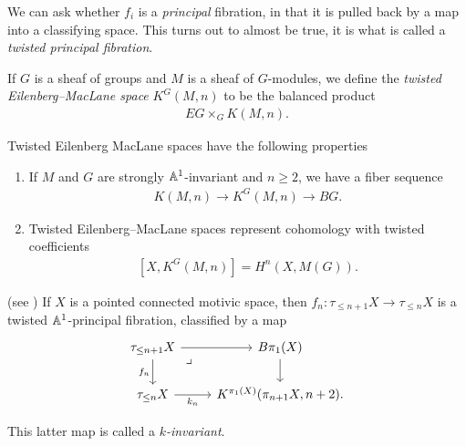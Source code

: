 \documentclass[11pt,openany]{book}
\begin{document}
We can ask whether $f_i$ is a \textit{principal} fibration, in that it is pulled back by a map into a classifying space. This turns out to almost be true, it is what is called a \textit{twisted principal fibration}.

\begin{definition} \cite[B.2]{Morel}
If $G$ is a sheaf of groups and $M$ is a sheaf of $G$-modules, we define the \textit{twisted Eilenberg--MacLane space} $K^G(M,n)$ to be the balanced product
\begin{align*}
    EG \times_G K(M,n).
\end{align*}
\end{definition}

\begin{proposition} Twisted Eilenberg MacLane spaces have the following properties
\begin{enumerate}
    \item If $M$ and $G$ are strongly $\mathbb{A}^1$-invariant and $n\ge 2$, we have a fiber sequence \cite[4.17]{ABH-nilpotent}
    \begin{align*}
        K(M,n) \to K^G(M,n) \to BG.
    \end{align*}
    
    \item Twisted Eilenberg--MacLane spaces represent cohomology with twisted coefficients
    \begin{align*}
        \left[ X, K^G(M,n) \right] = H^n(X,M(G)).
    \end{align*}
\end{enumerate}
\end{proposition}


\begin{proposition} (see \cite[6.1]{AF3}) If $X$ is a pointed connected motivic space, then $f_n \colon \tau_{\le n+1} X \to \tau_{\le n} X$ is a twisted $\mathbb{A}^1$-principal fibration, classified by a map
\[\begin{tikzcd}
    \tau_{\le n+1}X\rar\dar["f_n" left]\pb & B\pi_1(X)\dar\\
    \tau_{\le n} X\rar["k_n" below] & {K^{\pi_1(X)}(\pi_{n+1}X, n+2)}.
\end{tikzcd} \]
\end{proposition}
This latter map is called a $k$\textit{-invariant}.
\end{document}
